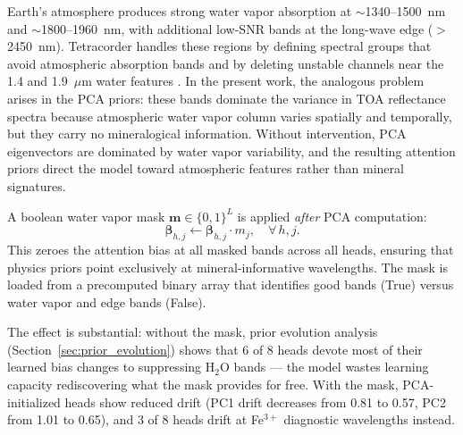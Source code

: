 \documentclass[11pt]{report}
\begin{document}
Earth’s atmosphere produces strong water vapor absorption at $\sim$1340--1500~nm and $\sim$1800--1960~nm, with additional low-SNR bands at the long-wave edge ($>$2450~nm). Tetracorder handles these regions by defining spectral groups that avoid atmospheric absorption bands and by deleting unstable channels near the 1.4 and 1.9~$\mu$m water features \cite{clark2024tetracorder}. In the present work, the analogous problem arises in the PCA priors: these bands dominate the variance in TOA reflectance spectra because atmospheric water vapor column varies spatially and temporally, but they carry no mineralogical information. Without intervention, PCA eigenvectors are dominated by water vapor variability, and the resulting attention priors direct the model toward atmospheric features rather than mineral signatures.

A boolean water vapor mask $\mathbf{m} \in \{0, 1\}^L$ is applied \emph{after} PCA computation:
\begin{equation}
\bm{\beta}_{h,j} \leftarrow \bm{\beta}_{h,j} \cdot m_j, \quad \forall\, h, j.
\label{eq:wv_mask}
\end{equation}
This zeroes the attention bias at all masked bands across all heads, ensuring that physics priors point exclusively at mineral-informative wavelengths. 
The mask is loaded from a precomputed binary array that identifies good bands (True) versus water vapor and edge bands (False).

The effect is substantial: without the mask, prior evolution analysis (Section~\ref{sec:prior_evolution}) shows that 6 of 8 heads devote most of their learned bias changes to suppressing H$_2$O bands --- the model wastes learning capacity rediscovering what the mask provides for free. With the mask, PCA-initialized heads show reduced drift (PC1 drift decreases from 0.81 to 0.57, PC2 from 1.01 to 0.65), and 3 of 8 heads drift at Fe$^{3+}$ diagnostic wavelengths instead.
\end{document}

